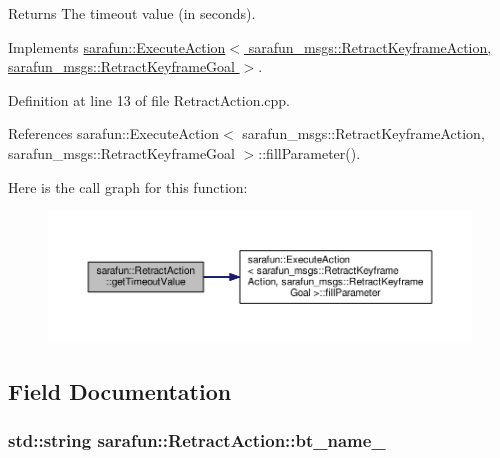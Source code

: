 \begin{DoxyReturn}{Returns}
The timeout value (in seconds). 
\end{DoxyReturn}


Implements \hyperlink{classsarafun_1_1ExecuteAction_aba6cfa8a8ce19e735eb6394424df6d17_aba6cfa8a8ce19e735eb6394424df6d17}{sarafun\-::\-Execute\-Action$<$ sarafun\-\_\-msgs\-::\-Retract\-Keyframe\-Action, sarafun\-\_\-msgs\-::\-Retract\-Keyframe\-Goal $>$}.



Definition at line 13 of file Retract\-Action.\-cpp.



References sarafun\-::\-Execute\-Action$<$ sarafun\-\_\-msgs\-::\-Retract\-Keyframe\-Action, sarafun\-\_\-msgs\-::\-Retract\-Keyframe\-Goal $>$\-::fill\-Parameter().



Here is the call graph for this function\-:\nopagebreak
\begin{figure}[H]
\begin{center}
\leavevmode
\includegraphics[width=350pt]{d4/dd3/classsarafun_1_1RetractAction_af95bb8d3826dbe1444a8a3e12d8596b0_af95bb8d3826dbe1444a8a3e12d8596b0_cgraph}
\end{center}
\end{figure}




\subsection{Field Documentation}
\hypertarget{classsarafun_1_1RetractAction_a186b48e8f63ea5e0cd8c8047cfa36843_a186b48e8f63ea5e0cd8c8047cfa36843}{
\subsubsection[{bt\-\_\-name\-\_\-}]{\setlength{\rightskip}{0pt plus 5cm}std\-::string sarafun\-::\-Retract\-Action\-::bt\-\_\-name\-\_\-\hspace{0.3cm}{\ttfamily [private]}}}\label{classsarafun_1_1RetractAction_a186b48e8f63ea5e0cd8c8047cfa36843_a186b48e8f63ea5e0cd8c8047cfa36843}


